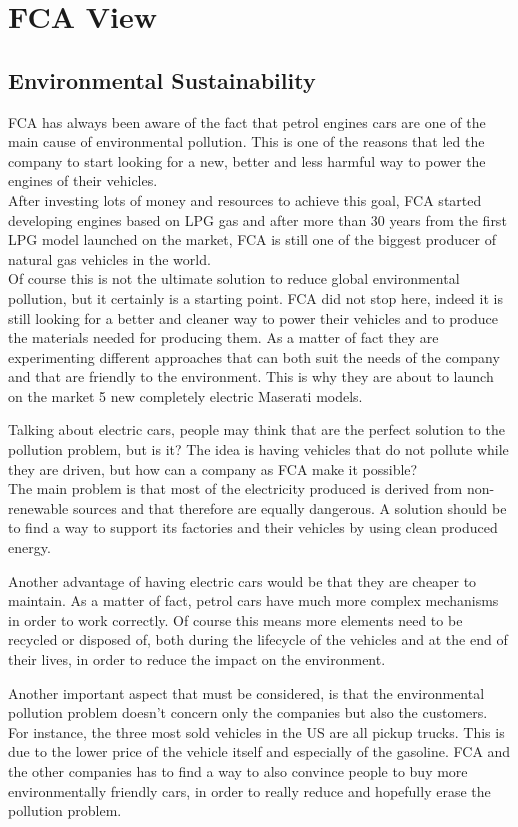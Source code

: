 \section{FCA View}
\subsection{Environmental Sustainability}
FCA has always been aware of the fact that petrol engines cars are one of the main cause of environmental pollution. This is one of the reasons that led the company to start looking for a new, better and less harmful way to power the engines of their vehicles.\\
After investing lots of money and resources to achieve this goal, FCA started developing engines based on LPG gas and after more than 30 years from the first LPG model launched on the market, FCA is still one of the biggest producer of natural gas vehicles in the world\cite{FCA_sustainability}.\\
Of course this is not the ultimate solution to reduce global environmental pollution, but it certainly is a starting point. FCA did not stop here, indeed it is still looking for a better and cleaner way to power their vehicles and to produce the materials needed for producing them. As a matter of fact they are experimenting different approaches that can both suit the needs of the company and that are friendly to the environment. This is why they are about to launch on the market 5 new completely electric Maserati models\cite{Maserati_electric}.

Talking about electric cars, people may think that are the perfect solution to the pollution problem, but is it?
The idea is having vehicles that do not pollute while they are driven, but how can a company as FCA make it possible?\\
The main problem is that most of the electricity produced is derived from non-renewable sources and that therefore are equally dangerous. A solution should be to find a way to support its factories and their vehicles by using clean produced energy.

Another advantage of having electric cars would be that they are cheaper to maintain. As a matter of fact, petrol cars have much more complex mechanisms in order to work correctly. Of course this means more elements need to be recycled or disposed of, both during the lifecycle of the vehicles and at the end of their lives, in order to reduce the impact on the environment.

Another important aspect that must be considered, is that the environmental pollution problem doesn't concern only the companies but also the customers. For instance, the three most sold vehicles in the US are all pickup trucks\cite{US_best-selling-vehicle}. This is due to the lower price of the vehicle itself and especially of the gasoline. 
FCA and the other companies has to find a way to also convince people to buy more environmentally friendly cars, in order to really reduce and hopefully erase the pollution problem.

